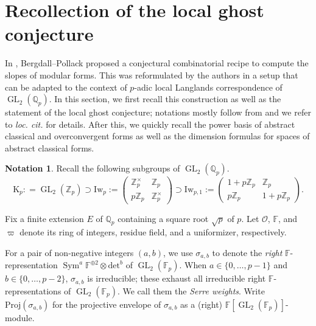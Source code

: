 \documentclass[12pt]{amsart}
\theoremstyle{definition}
\newtheorem{notation}[subsection]{Notation}
\numberwithin{equation}{subsection}
\def\calO{\mathcal{O}}
\def\FF{\mathbb{F}}
\def\QQ{\mathbb{Q}}
\def\ZZ{\mathbb{Z}}
\def\rmK{\mathrm{K}}
\newcommand{\Proj}{\mathrm{Proj}}
\DeclareMathOperator{\GL}{GL}
\DeclareMathOperator{\Sym}{Sym}
\newcommand{\Iw}{\mathrm{Iw}}
\renewcommand{\det}{\mathrm{det}}
\begin{document}
\section{Recollection of the local ghost conjecture}
\label{Sec:recollection of local ghost}

In \cite{bergdall-pollack, bergdall-pollack2, bergdall-pollack3}, Bergdall--Pollack proposed a conjectural combinatorial recipe to compute the slopes of modular forms. This was reformulated by the authors \cite{liu-truong-xiao-zhao} in a setup that can be adapted to the context of $p$-adic local Langlands correspondence of $\GL_2(\QQ_p)$.  In this section, we first recall this construction as well as the statement of the local ghost conjecture; notations mostly follow from \cite{liu-truong-xiao-zhao} and we refer to {\it loc. cit.} for details. After this, we quickly recall the power basis of abstract classical and overconvergent forms as well as the dimension formulas for spaces of abstract classical forms.

\begin{notation}
\label{N:Serre weights}
Recall the following subgroups of $\GL_2(\QQ_p)$.
$$
\rmK_p: =\GL_2(\ZZ_p) \supset \Iw_p := \begin{pmatrix}
\ZZ_p^\times & \ZZ_p \\ p \ZZ_p & \ZZ_p^\times
\end{pmatrix} \supset
\Iw_{p,1} := \begin{pmatrix}
1+p\ZZ_p & \ZZ_p \\ p \ZZ_p & 1+p\ZZ_p
\end{pmatrix}.$$

Fix a finite extension $E$ of $\QQ_p$ containing a square root $\sqrt p$ of $p$. Let $\calO$, $\FF$, and $\varpi$ denote its ring of integers, residue field, and a uniformizer, respectively.

For a pair of non-negative integers $(a,b)$, we use $\sigma_{a,b}$ to denote the \emph{right} $\FF$-representation $\Sym^a\FF^{\oplus 2} \otimes \det^b$ of $\GL_2(\FF_p)$.
When $a \in \{0, \dots, p-1\}$ and $b \in \{0, \dots, p-2\}$, $\sigma_{a,b}$ is irreducible; these exhaust all irreducible right $\FF$-representations of $\GL_2(\FF_p)$. We call them the \emph{Serre weights}.
Write $\Proj(\sigma_{a,b})$ for the projective envelope of $\sigma_{a,b}$ as a (right) $\FF[\GL_2(\FF_p)]$-module.
\end{notation}
\end{document}

